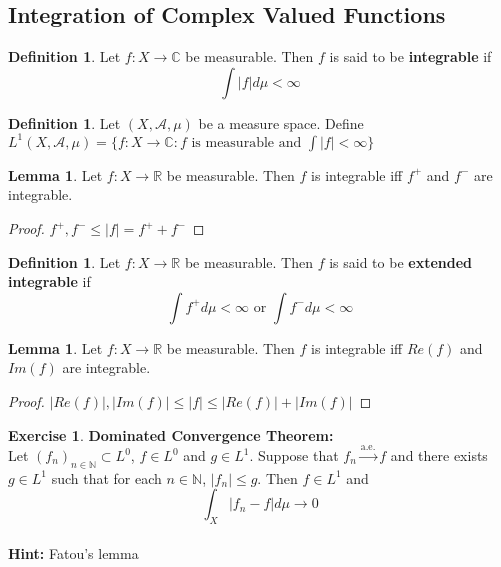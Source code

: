 \documentclass[12pt]{amsart}
\theoremstyle{definition}
\newtheorem{defn}[definition]{Definition}
\newtheorem{lem}[definition]{Lemma}
\newtheorem{ex}[definition]{Exercise}
\newcommand{\C}{\mathbb{C}}
\newcommand{\N}{\mathbb{N}}
\newcommand{\R}{\mathbb{R}}
\newcommand{\MA}{\mathcal{A}}
\newcommand{\convt}[1]{\xrightarrow{\text{#1}}}
\newcommand{\lex}[1]{\label{ex:#1}}
\newcommand{\ld}[1]{\label{defn:#1}}
\begin{document}
	
	
	
	
	
	
	
	
	
	
	
	
	
	
	\newpage
	\subsection{Integration of Complex Valued Functions}
	
	\begin{defn} \ld{00000} 
		Let $f:X \rightarrow \C$ be measurable. Then $f$ is said to be \textbf{integrable} if $$\int |f| d\mu < \infty$$
	\end{defn}
	
	\begin{defn} \ld{00000} 
		Let $(X, \MA, \mu)$ be a measure space. Define $L^1(X, \MA, \mu) = \{f:X \rightarrow \C : f \text{ is measurable and } \int |f| < \infty \}$
	\end{defn}
	
	\begin{lem}
		Let $f:X \rightarrow \R$ be measurable. Then $f$ is integrable iff $f^+$ and $f^-$ are integrable. 
	\end{lem}
	
	\begin{proof}
		$f^+,f^- \leq |f| = f^+ + f^-$
	\end{proof}
	
	\begin{defn} \ld{00000} 
		Let $f:X \rightarrow \R$ be measurable. Then $f$ is said to be \textbf{extended integrable} if $$\int f^+ d\mu  < \infty \text{ or } \int f^- d\mu < \infty$$
	\end{defn}
	
	\begin{lem}
		Let $f:X \rightarrow \R$ be measurable. Then $f$ is integrable iff $Re(f)$ and $Im(f)$ are integrable.
	\end{lem}
	
	\begin{proof}
		$|Re(f)|, |Im(f)| \leq |f| \leq |Re(f)| + |Im(f)|$
	\end{proof}
	
	\begin{ex}\textbf{Dominated Convergence Theorem:}\\
	\lex{00000}
		Let $(f_n)_{n \in \N} \subset L^0$, $f \in L^0$ and $g \in L^1$. Suppose that $f_n \convt{a.e.} f$ and there exists $g \in L^1$ such that for each $n \in \N$, $|f_n| \leq g$. Then $f \in L^1$ and $$\int_X |f_n - f| d\mu \rightarrow 0$$ \\
		\textbf{Hint:} Fatou's lemma
	\end{ex}
	
\end{document}

